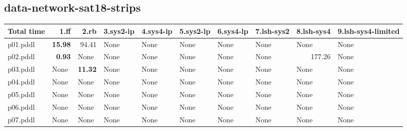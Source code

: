 \documentclass{article}
\begin{document}
\hypertarget{total_time-data-network-sat18-strips}{}
\subsection*{data-network-sat18-strips}

\begin{tabular}{@{}lrrrrrrrrr@{}}
Total time & 1.ff & 2.rb & 3.sys2-ip & 4.sys4-ip & 5.sys2-lp & 6.sys4-lp & 7.lsh-sys2 & 8.lsh-sys4 & 9.lsh-sys4-limited \\
\midrule
p01.pddl & \textbf{15.98} & 94.41 & \multicolumn{1}{|l|}{None} & \multicolumn{1}{|l|}{None} & \multicolumn{1}{|l|}{None} & \multicolumn{1}{|l|}{None} & \multicolumn{1}{|l|}{None} & \multicolumn{1}{|l|}{None} & \multicolumn{1}{|l|}{None} \\
p02.pddl & \textbf{0.93} & \multicolumn{1}{|l|}{None} & \multicolumn{1}{|l|}{None} & \multicolumn{1}{|l|}{None} & \multicolumn{1}{|l|}{None} & \multicolumn{1}{|l|}{None} & \multicolumn{1}{|l|}{None} & 177.26 & \multicolumn{1}{|l|}{None} \\
p03.pddl & \multicolumn{1}{|l|}{None} & \textbf{11.32} & \multicolumn{1}{|l|}{None} & \multicolumn{1}{|l|}{None} & \multicolumn{1}{|l|}{None} & \multicolumn{1}{|l|}{None} & \multicolumn{1}{|l|}{None} & \multicolumn{1}{|l|}{None} & \multicolumn{1}{|l|}{None} \\
p04.pddl & \multicolumn{1}{|l|}{None} & \multicolumn{1}{|l|}{None} & \multicolumn{1}{|l|}{None} & \multicolumn{1}{|l|}{None} & \multicolumn{1}{|l|}{None} & \multicolumn{1}{|l|}{None} & \multicolumn{1}{|l|}{None} & \multicolumn{1}{|l|}{None} & \multicolumn{1}{|l|}{None} \\
p05.pddl & \multicolumn{1}{|l|}{None} & \multicolumn{1}{|l|}{None} & \multicolumn{1}{|l|}{None} & \multicolumn{1}{|l|}{None} & \multicolumn{1}{|l|}{None} & \multicolumn{1}{|l|}{None} & \multicolumn{1}{|l|}{None} & \multicolumn{1}{|l|}{None} & \multicolumn{1}{|l|}{None} \\
p06.pddl & \multicolumn{1}{|l|}{None} & \multicolumn{1}{|l|}{None} & \multicolumn{1}{|l|}{None} & \multicolumn{1}{|l|}{None} & \multicolumn{1}{|l|}{None} & \multicolumn{1}{|l|}{None} & \multicolumn{1}{|l|}{None} & \multicolumn{1}{|l|}{None} & \multicolumn{1}{|l|}{None} \\
p07.pddl & \multicolumn{1}{|l|}{None} & \multicolumn{1}{|l|}{None} & \multicolumn{1}{|l|}{None} & \multicolumn{1}{|l|}{None} & \multicolumn{1}{|l|}{None} & \multicolumn{1}{|l|}{None} & \multicolumn{1}{|l|}{None} & \multicolumn{1}{|l|}{None} & \multicolumn{1}{|l|}{None} \\

\end{tabular}
\end{document}
